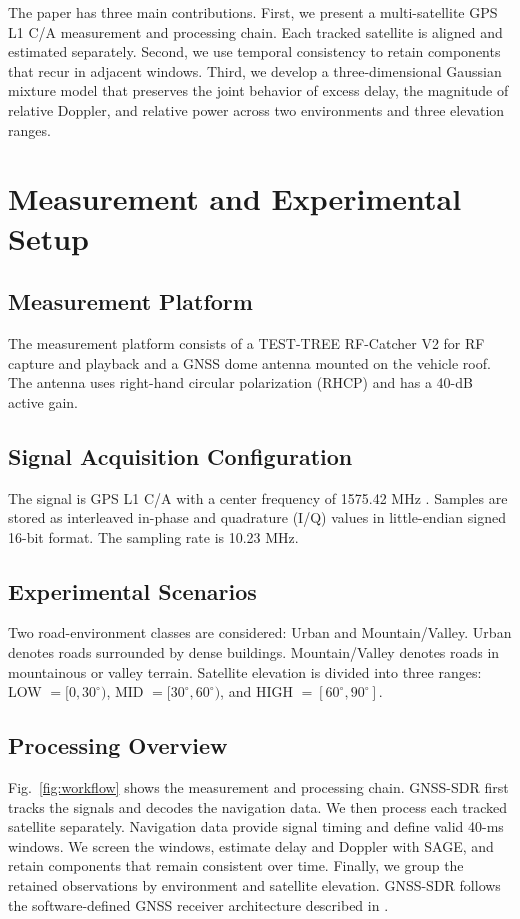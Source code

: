 \documentclass[conference]{IEEEtran}
\begin{document}
The paper has three main contributions. First, we present a multi-satellite GPS L1 C/A measurement and processing chain. Each tracked satellite is aligned and estimated separately. Second, we use temporal consistency to retain components that recur in adjacent windows. Third, we develop a three-dimensional Gaussian mixture model that preserves the joint behavior of excess delay, the magnitude of relative Doppler, and relative power across two environments and three elevation ranges.

\section{Measurement and Experimental Setup}
\subsection{Measurement Platform}
The measurement platform consists of a TEST-TREE RF-Catcher V2 for RF capture and playback and a GNSS dome antenna mounted on the vehicle roof. The antenna uses right-hand circular polarization (RHCP) and has a 40-dB active gain.

\subsection{Signal Acquisition Configuration}
The signal is GPS L1 C/A with a center frequency of 1575.42 MHz \cite{gpsis200n2022}. Samples are stored as interleaved in-phase and quadrature (I/Q) values in little-endian signed 16-bit format. The sampling rate is 10.23 MHz.

\subsection{Experimental Scenarios}
Two road-environment classes are considered: Urban and Mountain/Valley. Urban denotes roads surrounded by dense buildings. Mountain/Valley denotes roads in mountainous or valley terrain. Satellite elevation is divided into three ranges: LOW $=[0,30^\circ)$, MID $=[30^\circ,60^\circ)$, and HIGH $=[60^\circ,90^\circ]$.

\subsection{Processing Overview}
Fig.~\ref{fig:workflow} shows the measurement and processing chain. GNSS-SDR first tracks the signals and decodes the navigation data. We then process each tracked satellite separately. Navigation data provide signal timing and define valid 40-ms windows. We screen the windows, estimate delay and Doppler with SAGE, and retain components that remain consistent over time. Finally, we group the retained observations by environment and satellite elevation. GNSS-SDR follows the software-defined GNSS receiver architecture described in \cite{fernandez2011gnsssdr}.
\end{document}
